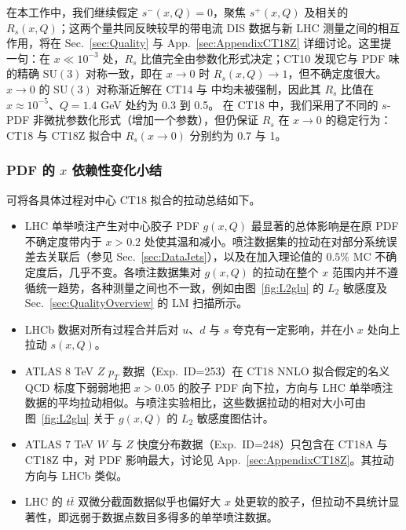 在本工作中，我们继续假定 $s^-(x,Q)=0$，聚焦 $s^+(x,Q)$ 及相关的 $R_s(x,Q)$；这两个量共同反映较早的带电流 DIS 数据与新 LHC 测量之间的相互作用，将在 Sec.~\ref{sec:Quality} 与 App.~\ref{sec:AppendixCT18Z} 详细讨论。这里提一句：在 $x  \ll 10 ^{-3}$ 处，$R_s$
比值完全由参数化形式决定；CT10 发现它与 PDF 味的精确 $\mathrm{SU}(3)$ 对称一致，即在 $x\rightarrow 0$ 时 $R_s(x,Q) \rightarrow 1$，但不确定度很大。
$x\rightarrow 0$ 的 $\mathrm{SU}(3)$ 对称渐近解在 CT14 与 \CTHERAII{} 中均未被强制，因此其 $R_s$ 比值在 $x\approx 10^{-5}$、$Q=1.4$ GeV 处约为 0.3 到 0.5。
在 CT18 中，我们采用了不同的 $s$-PDF 非微扰参数化形式（增加一个参数），但仍保证 $R_s$ 在 $x\! \to\! 0$ 的稳定行为：CT18 与 CT18Z 拟合中 $R_s (x \to 0)$ 分别约为 0.7 与 1。

\subsubsection{PDF 的 $x$ 依赖性变化小结}
可将各具体过程对中心 CT18 拟合的拉动总结如下。

\begin{itemize}

\item LHC 单举喷注产生对中心胶子 PDF $g(x,Q)$ 最显著的总体影响是在原 PDF 不确定度带内于 $x > 0.2$ 处使其温和减小。喷注数据集的拉动在对部分系统误差去关联后（参见 Sec.~\ref{sec:DataJets}），以及在加入理论值的 $0.5\%$ MC 不确定度后，几乎不变。各喷注数据集对 $g(x,Q)$ 的拉动在整个 $x$ 范围内并不遵循统一趋势，各种测量之间也不一致，例如由图~\ref{fig:L2glu} 的 $L_2$
敏感度及 Sec.~\ref{sec:QualityOverview} 的 LM 扫描所示。

\item LHCb 数据对所有过程合并后对 $u$、$d$ 与 $s$ 夸克有一定影响，并在小 $x$ 处向上拉动 $s (x,Q)$。

\item ATLAS 8 TeV $Z$ $p_T$ 数据（Exp.~ID=253）在 CT18 NNLO 拟合假定的名义 QCD 标度下弱弱地把 $x>0.05$ 的胶子 PDF 向下拉，方向与 LHC 单举喷注数据的平均拉动相似。与喷注实验相比，这些数据拉动的相对大小可由图~\ref{fig:L2glu} 关于 $g(x,Q)$ 的 $L_2$ 敏感度图估计。

\item ATLAS 7 TeV $W$ 与 $Z$ 快度分布数据（Exp.~ID=248）只包含在 CT18A 与 CT18Z 中，对 PDF 影响最大，讨论见
App.~\ref{sec:AppendixCT18Z}。其拉动方向与 LHCb 类似。

\item LHC 的 $t \bar t$ 双微分截面数据似乎也偏好大 $x$ 处更软的胶子，但拉动不具统计显著性，即远弱于数据点数目多得多的单举喷注数据。

\end{itemize}

